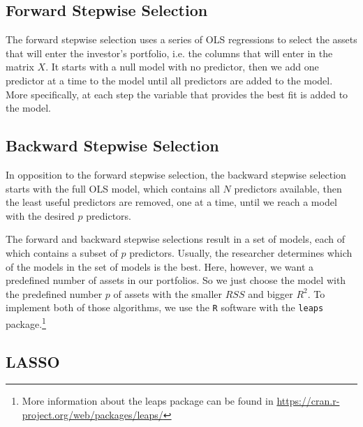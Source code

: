 \documentclass[preprint, doubleblind, authoryear,10pt]{elsarticle}
\begin{document}
\subsection{Forward Stepwise Selection}

The forward stepwise selection uses a series of OLS regressions to select the assets that will enter the investor's portfolio, i.e. the columns that will enter in the matrix $X$.
It starts with a null model with no predictor, then we add one predictor at a time to the model until all predictors are added to the model.
More specifically, at each step the variable that provides the best fit is added to the model.

\subsection{Backward Stepwise Selection}

In opposition to the forward stepwise selection, the backward stepwise selection starts with the full OLS model, which contains all $N$ predictors available, then the least useful predictors are removed, one at a time, until we reach a model with the desired $p$ predictors.

The forward and backward stepwise selections result in a set of models, each of which contains a subset of $p$ predictors.
Usually, the researcher determines which of the models in the set of models is the best.
Here, however, we want a predefined number of assets in our portfolios.
So we just choose the model with the predefined number $p$ of assets with the smaller $RSS$ and bigger $R^2$.
To implement both of those algorithms, we  use the \texttt{R} software with the \texttt{leaps} package.\footnote{More information about the leaps package can be found in \url{https://cran.r-project.org/web/packages/leaps/}}

\subsection{LASSO}
\end{document}
